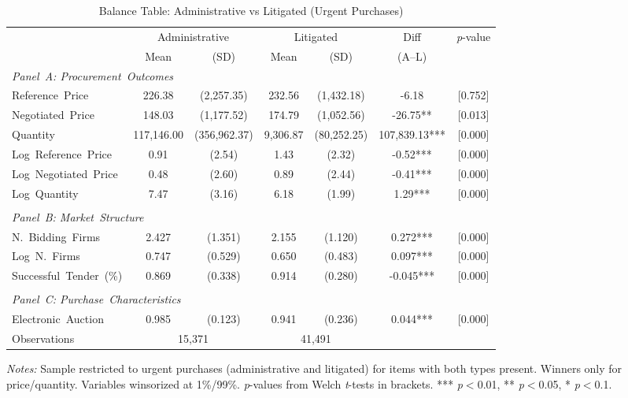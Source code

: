 \begin{table}[ht]
  \centering
  \caption{Balance Table: Administrative vs Litigated (Urgent Purchases)}
  \label{tab:balance}
  \footnotesize
  \begin{threeparttable}
  \begin{tabular}{lcccccc}
    \hline\hline
    & \multicolumn{2}{c}{Administrative} & \multicolumn{2}{c}{Litigated} & Diff & \textit{p}-value \\
    \cmidrule(lr){2-3} \cmidrule(lr){4-5}
    & Mean & (SD) & Mean & (SD) & (A--L) & \\
    \hline
    \multicolumn{7}{l}{\textit{Panel~A: Procurement~Outcomes}} \\[3pt]
    Reference~Price & 226.38 & (2,257.35) & 232.56 & (1,432.18) & -6.18 & [0.752] \\
    Negotiated~Price & 148.03 & (1,177.52) & 174.79 & (1,052.56) & -26.75** & [0.013] \\
    Quantity & 117,146.00 & (356,962.37) & 9,306.87 & (80,252.25) & 107,839.13*** & [0.000] \\
    Log~Reference~Price & 0.91 & (2.54) & 1.43 & (2.32) & -0.52*** & [0.000] \\
    Log~Negotiated~Price & 0.48 & (2.60) & 0.89 & (2.44) & -0.41*** & [0.000] \\
    Log~Quantity & 7.47 & (3.16) & 6.18 & (1.99) & 1.29*** & [0.000] \\
    \\[3pt]
    \multicolumn{7}{l}{\textit{Panel~B: Market~Structure}} \\[3pt]
    N.~Bidding~Firms & 2.427 & (1.351) & 2.155 & (1.120) & 0.272*** & [0.000] \\
    Log~N.~Firms & 0.747 & (0.529) & 0.650 & (0.483) & 0.097*** & [0.000] \\
    Successful~Tender~(\%) & 0.869 & (0.338) & 0.914 & (0.280) & -0.045*** & [0.000] \\
    \\[3pt]
    \multicolumn{7}{l}{\textit{Panel~C: Purchase~Characteristics}} \\[3pt]
    Electronic~Auction & 0.985 & (0.123) & 0.941 & (0.236) & 0.044*** & [0.000] \\
    \hline
    Observations & \multicolumn{2}{c}{15,371} & \multicolumn{2}{c}{41,491} & & \\
    \hline\hline
  \end{tabular}
  \begin{tablenotes}
    \small
    \item \textit{Notes:} Sample restricted to urgent purchases (administrative and litigated) for items with both types present. Winners only for price/quantity. Variables winsorized at 1\%/99\%. \textit{p}-values from Welch \textit{t}-tests in brackets. *** \textit{p}$<$0.01, ** \textit{p}$<$0.05, * \textit{p}$<$0.1.
  \end{tablenotes}
  \end{threeparttable}
\end{table}
